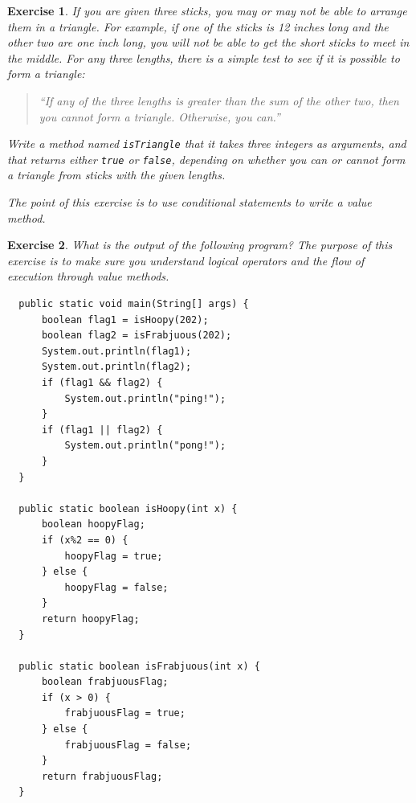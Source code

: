 \documentclass[12pt]{book}
\theoremstyle{exercise}
\newtheorem{exercise}{Exercise}[chapter]
\begin{document}
\begin{exercise}
If you are given three sticks, you may or may not be able to arrange
them in a triangle.  For example, if one of the sticks is 12 inches
long and the other two are one inch long, you will
not be able to get the short sticks to meet in the middle.  For any
three lengths, there is a simple test to see if it is possible to form
a triangle:

\begin{quotation}
``If any of the three lengths is greater than the sum of the other two,
then you cannot form a triangle.  Otherwise, you can.''
\end{quotation}

Write a method named {\tt isTriangle} that it takes three integers as
arguments, and that returns either {\tt true} or {\tt false},
depending on whether you can or cannot form a triangle from sticks
with the given lengths.

The point of this exercise is to use conditional statements to
write a value method.

\end{exercise}


\begin{exercise}
What is the output of the following program?  The purpose of
this exercise is to make sure you understand logical operators
and the flow of execution through value methods.

\begin{lstlisting}
  public static void main(String[] args) {
      boolean flag1 = isHoopy(202);
      boolean flag2 = isFrabjuous(202);
      System.out.println(flag1);
      System.out.println(flag2);
      if (flag1 && flag2) {
          System.out.println("ping!");
      }
      if (flag1 || flag2) {
          System.out.println("pong!");
      }
  }

  public static boolean isHoopy(int x) {
      boolean hoopyFlag;
      if (x%2 == 0) {
          hoopyFlag = true;
      } else {
          hoopyFlag = false;
      }
      return hoopyFlag;
  }

  public static boolean isFrabjuous(int x) {
      boolean frabjuousFlag;
      if (x > 0) {
          frabjuousFlag = true;
      } else {
          frabjuousFlag = false;
      }
      return frabjuousFlag;
  }
\end{lstlisting}
\end{exercise}
\end{document}
